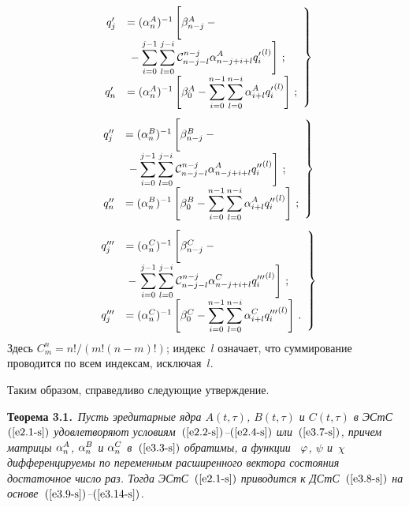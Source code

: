 \begin{multicols}{2}
\noindent
\begin{equation}
\left.
\begin{array}{rl}
q_j' &= (\alp_n^A)^{-1} \left[ \vphantom{\displaystyle\sss_{l=0}^{j-i} }
\beta_{n-j}^A -{}\right.\\
&\left.\displaystyle{}-\sss_{i=0}^{j-1} \sss_{l=0}^{j-i} 
{\cal C}_{n-j-l}^{n-j} \alp_{n-j+i+l}^A {q_i'}^{(l)}\right]\,;\\[9pt]
q_n' &= (\alp_n^A)^{-1} \lk \beta_{0}^A -\displaystyle\sss_{i=0}^{n-1} \sss_{l=0}^{n-i}  \alp_{i+l}^A {q_i'}^{(l)}\rk\,;
\end{array}
\right\}
\end{equation}
    \begin{equation}
\left.
\begin{array}{rl}
q_j'' &= (\alp_n^B)^{-1} \left[ \vphantom{\displaystyle\sss_{l=0}^{j-i} }
\beta_{n-j}^B -{}\right.\\
&\left.{}-\displaystyle\sss_{i=0}^{j-1} \sss_{l=0}^{j-i} {\cal C}_{n-j-l}^{n-j} 
\alp_{n-j+i+l}^A {q_i''}^{(l)}\right]\,;\\[9pt]
q_n'' &= \displaystyle(\alp_n^B)^{-1} \lk \beta_{0}^B -\sss_{i=0}^{n-1} \sss_{l=0}^{n-i}  \alp_{i+l}^A {q_i''}^{(l)}\rk\,;
\end{array}
\right\}
\end{equation}
\begin{equation}
\left.
\begin{array}{rl}
q_j''' &= (\alp_n^C)^{-1} \left[\vphantom{\displaystyle\sss_{l=0}^{j-i} }
 \beta_{n-j}^C -{}\right.\\
 &{}-\left.\displaystyle\sss_{i=0}^{j-1} \sss_{l=0}^{j-i} 
 {\cal C}_{n-j-l}^{n-j} \alp_{n-j+i+l}^C {q_i'''}^{(l)}\right]\,;\\[9pt]
q_j''' &= (\alp_n^C)^{-1} \lk \beta_{0}^C -\displaystyle\sss_{i=0}^{n-1} \sss_{l=0}^{n-i}  \alp_{i+l}^C {q_i'''}^{(l)}\rk\,.
\end{array}
\right\}
\label{e3.14-s}
\end{equation}
Здесь $C_m^n=n!/(m!(n-m)!)$; индекс~$l$ означает, что суммирование проводится 
по всем индексам, исключая~$l$.

Таким образом, справедливо следующие утверждение.

\medskip

\noindent
\textbf{Теорема 3.1.}\ 
\textit{Пусть эредитарные ядра $A(t,\tau)$, $B(t,\tau)$ и $C(t,\tau)$ в ЭСтС~$(\ref{e2.1-s})$ 
удовлетворяют условиям~$(\ref{e2.2-s})$--$(\ref{e2.4-s})$ 
или~$(\ref{e3.7-s})$, причем мат\-ри\-цы  $\alpha_n^A$, $\alpha_n^B$ и $\alpha_n^C$ 
в~$(\ref{e3.3-s})$ обратимы, а функции~ $\varphi$, $\psi$ и~$\chi$ 
дифференцируемы по переменным расширенного вектора состояния достаточное число раз. 
Тогда ЭСтС~$(\ref{e2.1-s})$ приводится к ДСтС~$(\ref{e3.8-s})$ на 
основе~$(\ref{e3.9-s})$--$(\ref{e3.14-s})$.
}


\end{multicols}
